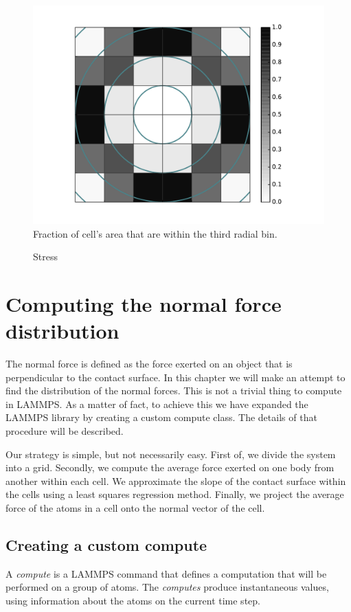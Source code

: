 \documentclass[twoside,english]{uiofysmaster}
\begin{document}
\begin{figure}
	\centering
	\hspace{0.87cm}
	\includegraphics[height=0.482\linewidth]{figures/forceDistribution/radialDistribution/weights.pdf}
	\caption{Fraction of cell's area that are within the third radial bin. }
	\label{fig:radialBinningWeights}
\end{figure}



\begin{figure}
	\center
	\resizebox{0.5\linewidth}{!}{
		
	}
	\caption{Stress}
	\label{fig:stressTensor}
\end{figure}


\chapter{Computing the normal force distribution}
The normal force is defined as the force exerted on an object that is perpendicular to the contact surface. 
In this chapter we will make an attempt to find the distribution of the normal forces. 
This is not a trivial thing to compute in LAMMPS. 
As a matter of fact, to achieve this we have expanded the LAMMPS library by creating a custom compute class. 
The details of that procedure will be described. 

Our strategy is simple, but not necessarily easy. 
First of, we divide the system into a grid. 
Secondly,  we compute the average force exerted on one body from another within each cell. 
We approximate the slope of the contact surface within the cells using a least squares regression method. 
Finally, we project the average force of the atoms in a cell onto the normal vector of the cell.


\section{Creating a custom compute}
A \textit{compute} is a LAMMPS command that defines a computation that will be performed on a group of atoms. The \textit{computes} produce instantaneous values, using information about the atoms on the current time step. 
\end{document}
